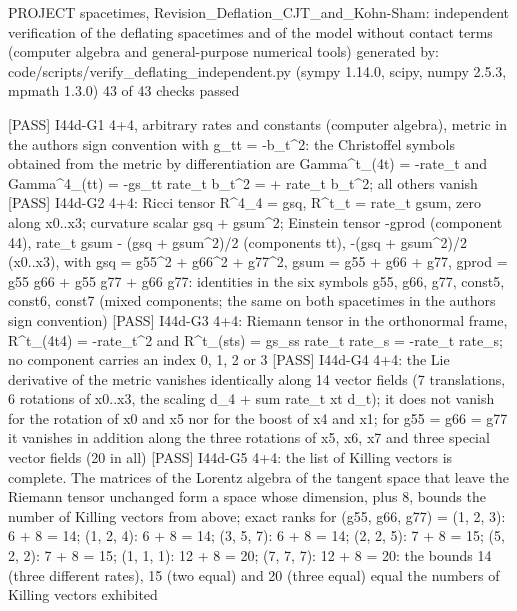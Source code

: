 \documentclass[
  10pt,
]{article}
\newenvironment{Shaded}{}{}
\newcommand{\NormalTok}[1]{#1}
\begin{document}
\begin{Shaded}
\begin{Highlighting}[]
\NormalTok{PROJECT spacetimes, Revision\_Deflation\_CJT\_and\_Kohn{-}Sham: independent verification of the deflating spacetimes and of the model without contact terms (computer algebra and general{-}purpose numerical tools)}
\NormalTok{generated by: code/scripts/verify\_deflating\_independent.py (sympy 1.14.0, scipy, numpy 2.5.3, mpmath 1.3.0)}
\NormalTok{43 of 43 checks passed}

\NormalTok{[PASS] I44d{-}G1  4+4, arbitrary rates and constants (computer algebra), metric in the author\textquotesingle{}s sign convention with g\_tt = {-}b\_t\^{}2: the Christoffel symbols obtained from the metric by differentiation are Gamma\^{}t\_(4t) = {-}rate\_t and Gamma\^{}4\_(tt) = {-}gs\_tt rate\_t b\_t\^{}2 = + rate\_t b\_t\^{}2; all others vanish}
\NormalTok{[PASS] I44d{-}G2  4+4: Ricci tensor R\^{}4\_4 = gsq, R\^{}t\_t = rate\_t gsum, zero along x0..x3; curvature scalar gsq + gsum\^{}2; Einstein tensor {-}gprod (component 44), rate\_t gsum {-} (gsq + gsum\^{}2)/2 (components tt), {-}(gsq + gsum\^{}2)/2 (x0..x3), with gsq = g55\^{}2 + g66\^{}2 + g77\^{}2, gsum = g55 + g66 + g77, gprod = g55 g66 + g55 g77 + g66 g77: identities in the six symbols g55, g66, g77, const5, const6, const7 (mixed components; the same on both spacetimes in the author\textquotesingle{}s sign convention)}
\NormalTok{[PASS] I44d{-}G3  4+4: Riemann tensor in the orthonormal frame, R\^{}t\_(4t4) = {-}rate\_t\^{}2 and R\^{}t\_(sts) = gs\_ss rate\_t rate\_s = {-}rate\_t rate\_s; no component carries an index 0, 1, 2 or 3}
\NormalTok{[PASS] I44d{-}G4  4+4: the Lie derivative of the metric vanishes identically along 14 vector fields (7 translations, 6 rotations of x0..x3, the scaling d\_4 + sum rate\_t xt d\_t); it does not vanish for the rotation of x0 and x5 nor for the boost of x4 and x1; for g55 = g66 = g77 it vanishes in addition along the three rotations of x5, x6, x7 and three special vector fields (20 in all)}
\NormalTok{[PASS] I44d{-}G5  4+4: the list of Killing vectors is complete. The matrices of the Lorentz algebra of the tangent space that leave the Riemann tensor unchanged form a space whose dimension, plus 8, bounds the number of Killing vectors from above; exact ranks for (g55, g66, g77) = (1, 2, 3): 6 + 8 = 14; (1, 2, 4): 6 + 8 = 14; (3, 5, 7): 6 + 8 = 14; (2, 2, 5): 7 + 8 = 15; (5, 2, 2): 7 + 8 = 15; (1, 1, 1): 12 + 8 = 20; (7, 7, 7): 12 + 8 = 20: the bounds 14 (three different rates), 15 (two equal) and 20 (three equal) equal the numbers of Killing vectors exhibited}

\end{Highlighting}
\end{Shaded}
\end{document}
